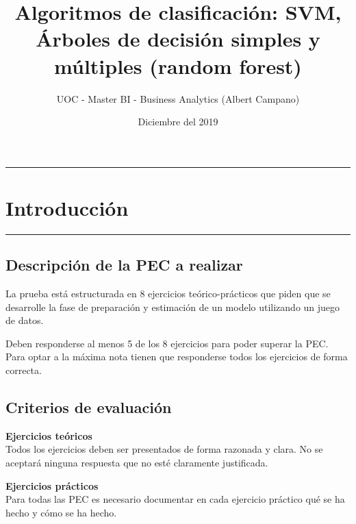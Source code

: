 \documentclass[]{article}
\title{Algoritmos de clasificación: SVM, Árboles de decisión simples y
múltiples (random forest)}
\author{UOC - Master BI - Business Analytics (Albert Campano)}
\date{Diciembre del 2019}
\begin{document}
\maketitle

{
\setcounter{tocdepth}{2}
\tableofcontents
}
\begin{center}\rule{0.5\linewidth}{\linethickness}\end{center}

\section{Introducción}\label{introduccion}

\begin{center}\rule{0.5\linewidth}{\linethickness}\end{center}

\subsection{Descripción de la PEC a
realizar}\label{descripcion-de-la-pec-a-realizar}

La prueba está estructurada en 8 ejercicios teórico-prácticos que piden
que se desarrolle la fase de preparación y estimación de un modelo
utilizando un juego de datos.

Deben responderse al menos 5 de los 8 ejercicios para poder superar la
PEC. Para optar a la máxima nota tienen que responderse todos los
ejercicios de forma correcta.

\subsection{Criterios de evaluación}\label{criterios-de-evaluacion}

\textbf{Ejercicios teóricos}\\
Todos los ejercicios deben ser presentados de forma razonada y clara. No
se aceptará ninguna respuesta que no esté claramente justificada.

\textbf{Ejercicios prácticos}\\
Para todas las PEC es necesario documentar en cada ejercicio práctico
qué se ha hecho y cómo se ha hecho.
\end{document}
